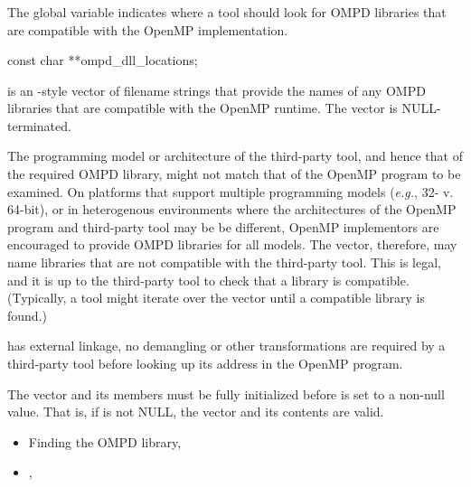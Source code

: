 \subsubsection{}
\label{subsubsec:ompd_dll_locations}

\summary
The global variable  indicates
where a tool should look for OMPD libraries that are compatible
with the OpenMP implementation.

\begin{cspecific}
\begin{ompSyntax}
const char **ompd_dll_locations;
\end{ompSyntax}
\end{cspecific}


\descr
{} is an -style vector of filename
strings that provide the names of any OMPD libraries
that are compatible with the OpenMP runtime.
The vector is NULL-terminated.

The programming model or architecture of the third-party tool, and
hence that of the required OMPD library, might not match that of
the OpenMP program to be examined.
On platforms that support multiple programming models (\textit{e.g.},
32- v. 64-bit), or in heterogenous  environments where the architectures
of the OpenMP program and third-party tool may be be different,
OpenMP implementors are encouraged to provide OMPD libraries for all models.
The vector, therefore, may name libraries that are not compatible
with the third-party tool.
This is legal, and it is up to the third-party tool to check that
a library is compatible.
(Typically, a tool might iterate over the vector until a compatible
library is found.)

\restrictions
{} has external  linkage,
no demangling or other transformations are required by a third-party
tool before looking up its address in the OpenMP program.

The vector and its members must be fully initialized before
 is set to a non-null value.
That is, if  is not NULL, the vector
and its contents are valid.

\crossreferences
\begin{itemize}
\item
  Finding the OMPD library, 
\item
  , 
\end{itemize}

